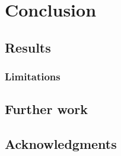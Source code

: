 \chapter{Conclusion}
\label{chap:conclusion}


\section{Results}

\subsection{Limitations}

\section{Further work}

\section{Acknowledgments}
